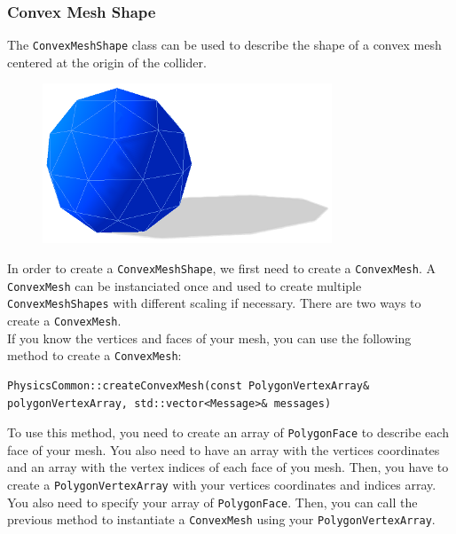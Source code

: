 \documentclass[a4paper,12pt]{article}
\begin{document}
    \vspace{0.6cm}

    \subsubsection{Convex Mesh Shape}

    The \texttt{ConvexMeshShape} class can be used to describe the shape of a convex mesh centered at the origin of the collider.

    \begin{figure}[!ht]
        \centering
        \includegraphics{convexshape.png}
        \label{fig:convexshape}
    \end{figure}

    In order to create a \texttt{ConvexMeshShape}, we first need to create a \texttt{ConvexMesh}. A \texttt{ConvexMesh} can be instanciated once and
    used to create multiple \texttt{ConvexMeshShapes} with different scaling if necessary. There are two ways to create a \texttt{ConvexMesh}. \\
    
    If you know the vertices and faces of your mesh, you can use the following method to create a \texttt{ConvexMesh}: \\

    \begin{lstlisting}
PhysicsCommon::createConvexMesh(const PolygonVertexArray& polygonVertexArray, std::vector<Message>& messages)
    \end{lstlisting}

    \vspace{0.6cm}

    To use this method, you need to create an array of \texttt{PolygonFace} to describe each face of your mesh. You also need to have an array with
    the vertices coordinates and an array with the vertex indices of each face of you mesh. Then, you have to create a \texttt{PolygonVertexArray} with
    your vertices coordinates and indices array. You also need to specify your array of \texttt{PolygonFace}. Then, you can call the previous method
    to instantiate a \texttt{ConvexMesh} using your \texttt{PolygonVertexArray}. \\ 
\end{document}

